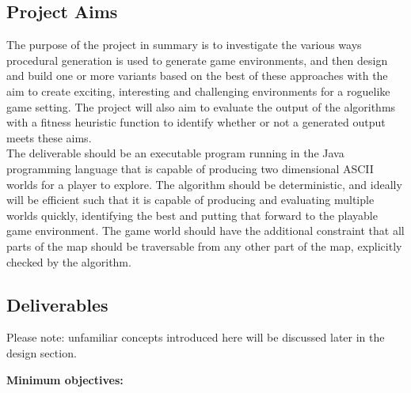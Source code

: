 \documentclass[12pt,a4paper]{article}
\begin{document}



\subsection{Project Aims}

The purpose of the project in summary is to investigate the various ways procedural generation is used to generate game environments, and then design and build one or more variants based on the best of these approaches with the aim to create exciting, interesting and challenging environments for a roguelike game setting. The project will also aim to evaluate the output of the algorithms with a fitness heuristic function to identify whether or not a generated output meets these aims. \\

The deliverable should be an executable program running in the Java programming language that is capable of producing two dimensional ASCII worlds for a player to explore. The algorithm should be deterministic, and ideally will be efficient such that it is capable of producing and evaluating multiple worlds quickly, identifying the best and putting that forward to the playable game environment. The game world should have the additional constraint that all parts of the map should be traversable from any other part of the map, explicitly checked by the algorithm. 




\subsection{Deliverables}


Please note: unfamiliar concepts introduced here will be discussed later in the design section.

\textbf{Minimum objectives:}
\end{document}
